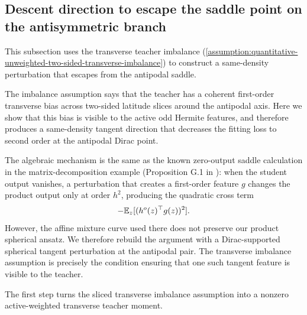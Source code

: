 
\subsection{Descent direction to escape the saddle point on the antisymmetric branch}
\label{subsec:descent-direction-to-escape}

This subsection uses the transverse teacher imbalance (\cref{assumption:quantitative-unweighted-two-sided-transverse-imbalance}) to construct a
same-density perturbation that escapes from the antipodal saddle.

The imbalance assumption says that the teacher has a coherent first-order
transverse bias across two-sided latitude slices around the antipodal axis. Here we show that this bias is visible to the active odd Hermite features, and
therefore produces a same-density tangent direction that decreases the fitting
loss to second order at the antipodal Dirac point.

\begin{remark}
    The algebraic mechanism is the same as the known zero-output saddle calculation in
the matrix-decomposition example (Proposition G.1 in \citet{yamamoto2025hessianguided}): when the
student output vanishes, a perturbation that creates a first-order feature
\(g\) changes the product output only at order \(h^2\), producing the quadratic
cross term
\[
    -\mathbb{E}_z[(h^o(z)^\top g(z))^2].
\]
However, the affine mixture curve used there does not preserve our product
spherical ansatz.  We therefore rebuild the argument
with a Dirac-supported spherical tangent perturbation at the antipodal pair.
The transverse imbalance assumption is precisely the condition ensuring that one such tangent feature is visible to the teacher.
\end{remark}

The first step turns the sliced transverse imbalance assumption into a nonzero active-weighted transverse teacher moment.

